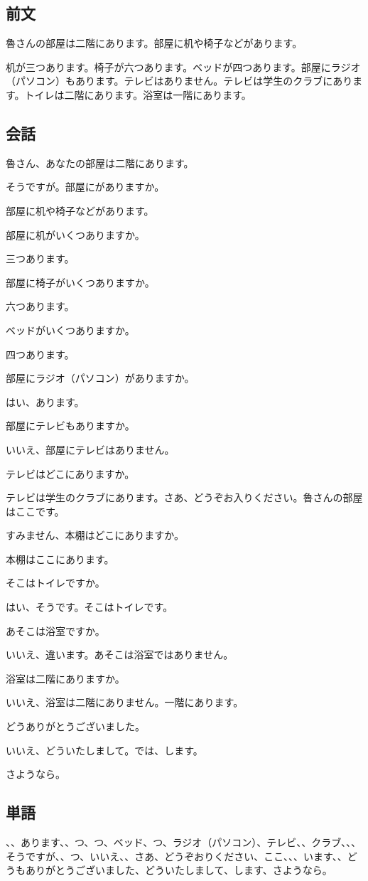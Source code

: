 \documentclass[a5j]{ltjtarticle}
\newcommand*{\RuSpeaks}{\item[魯]}
\newcommand*{\LiSpeaks}{\item[李]}
\begin{document}
\subsection*{前文}

魯さんの部屋は二階にあります。部屋に机や椅子などがあります。

机が三つあります。椅子が六つあります。ベッドが四つあります。部屋にラジオ（パソコン）もあります。テレビはありません。テレビは学生のクラブにあります。トイレは二階にあります。浴室は一階にあります。

\subsection*{会話}

\begin{dialogue}[labelwidth=\zw]
  \LiSpeaks 魯さん、あなたの部屋は二階にあります。
  \RuSpeaks そうですが。部屋にがありますか。
  \LiSpeaks 部屋に机や椅子などがあります。
  \RuSpeaks 部屋に机がいくつありますか。
  \LiSpeaks 三つあります。
  \RuSpeaks 部屋に椅子がいくつありますか。
  \LiSpeaks 六つあります。
  \RuSpeaks ベッドがいくつありますか。
  \LiSpeaks 四つあります。
  \RuSpeaks 部屋にラジオ（パソコン）がありますか。
  \LiSpeaks はい、あります。
  \RuSpeaks 部屋にテレビもありますか。
  \LiSpeaks いいえ、部屋にテレビはありません。
  \RuSpeaks テレビはどこにありますか。
  \LiSpeaks テレビは学生のクラブにあります。さあ、どうぞお入りください。魯さんの部屋はここです。
  \RuSpeaks すみません、本棚はどこにありますか。
  \LiSpeaks 本棚はここにあります。
  \RuSpeaks そこはトイレですか。
  \LiSpeaks はい、そうです。そこはトイレです。
  \RuSpeaks あそこは浴室ですか。
  \LiSpeaks いいえ、違います。あそこは浴室ではありません。
  \RuSpeaks 浴室は二階にありますか。
  \LiSpeaks いいえ、浴室は二階にありません。一階にあります。
  \RuSpeaks {}どうありがとうございました。
  \LiSpeaks いいえ、どういたしまして。では、します。
  \RuSpeaks さようなら。
\end{dialogue}

\subsection*{単語}

\begin{onehalfspace}
  、、あります、、つ、つ、ベッド、つ、ラジオ（パソコン）、テレビ、、クラブ、、、そうですが、、つ、いいえ、、さあ、どうぞおりください、ここ、、、います、、どうもありがとうございました、どういたしまして、します、さようなら。
\end{onehalfspace}
\end{document}
